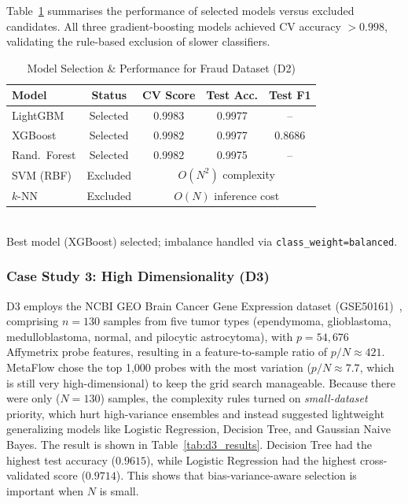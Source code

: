 \documentclass[conference]{llncs}
\begin{document}
   Table~\ref{tab:d2_results} summarises the performance of selected models versus excluded candidates. All three gradient-boosting models achieved CV accuracy $>0.998$, validating the rule-based exclusion of slower classifiers.

   \begin{table}[htbp]
   \centering
   \caption{Model Selection \& Performance for Fraud Dataset (D2)}
   \label{tab:d2_results}
   \small
   \begin{tabular}{lcccc}
   \hline
   \textbf{Model} & \textbf{Status} & \textbf{CV Score} & \textbf{Test Acc.} & \textbf{Test F1} \\
   \hline
   LightGBM  & Selected & 0.9983 & 0.9977 & -- \\
   XGBoost   & Selected & 0.9982 & 0.9977 & 0.8686 \\
   Rand.\ Forest & Selected & 0.9982 & 0.9975 & -- \\
   SVM (RBF) & Excluded & \multicolumn{3}{c}{$O(N^2)$ complexity} \\
   $k$-NN    & Excluded & \multicolumn{3}{c}{$O(N)$ inference cost} \\
   \hline
   \end{tabular}
   \vspace{1mm}
   \\{\scriptsize Best model (XGBoost) selected; imbalance handled via \texttt{class\_weight=balanced}.}
   \end{table}

   \subsubsection{Case Study 3: High Dimensionality (D3)} %
  D3 employs the NCBI GEO Brain Cancer Gene Expression dataset (GSE50161)~\cite{feltes2019cumida}, comprising $n=130$ samples from five tumor types (ependymoma, glioblastoma, medulloblastoma, normal, and pilocytic astrocytoma), with $p=54{,}676$ Affymetrix probe features, resulting in a feature-to-sample ratio of $p/N \approx 421$. MetaFlow chose the top 1{,}000 probes with the most variation ($p/N \approx 7.7$, which is still very high-dimensional) to keep the grid search manageable. Because there were only ($N=130$) samples, the complexity rules turned on \textit{small-dataset} priority, which hurt high-variance ensembles and instead suggested lightweight generalizing models like Logistic Regression, Decision Tree, and Gaussian Naive Bayes.
  The result is shown in Table~\ref{tab:d3_results}. Decision Tree had the highest test accuracy ($0.9615$), while Logistic Regression had the highest cross-validated score ($0.9714$). This shows that bias-variance-aware selection is important when $N$ is small.
\end{document}
